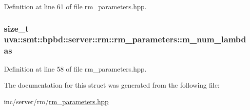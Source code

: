Definition at line 61 of file rm\+\_\+parameters.\+hpp.

\hypertarget{structuva_1_1smt_1_1bpbd_1_1server_1_1rm_1_1rm__parameters_a7628e93cac518235ba74d2a02f95a237}{}
\subsubsection[{m\+\_\+num\+\_\+lambdas}]{\setlength{\rightskip}{0pt plus 5cm}size\+\_\+t uva\+::smt\+::bpbd\+::server\+::rm\+::rm\+\_\+parameters\+::m\+\_\+num\+\_\+lambdas}\label{structuva_1_1smt_1_1bpbd_1_1server_1_1rm_1_1rm__parameters_a7628e93cac518235ba74d2a02f95a237}


Definition at line 58 of file rm\+\_\+parameters.\+hpp.



The documentation for this struct was generated from the following file\+:\begin{DoxyCompactItemize}
\item 
inc/server/rm/\hyperlink{rm__parameters_8hpp}{rm\+\_\+parameters.\+hpp}\end{DoxyCompactItemize}
